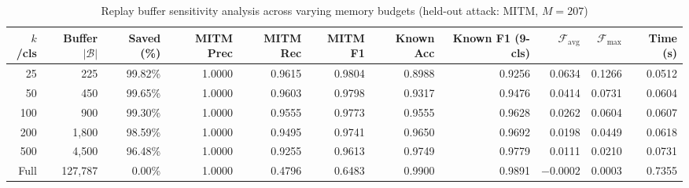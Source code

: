 \begin{table}[htbp]
\centering
\scriptsize
\setlength{\tabcolsep}{3pt}
\renewcommand{\arraystretch}{1.25}
\caption{Replay buffer sensitivity analysis across varying memory budgets (held-out attack: MITM, $M = 207$)}
\label{tab:phase7_1_sensitivity}
\begin{tabular}{|r|r|r|r|r|r|r|r|r|r|r|}
\hline
\textbf{$k$/cls} & \textbf{Buffer $|\mathcal{B}|$} & \textbf{Saved (\%)} & \textbf{MITM Prec} & \textbf{MITM Rec} & \textbf{MITM F1} & \textbf{Known Acc} & \textbf{Known F1 (9-cls)} & $\mathcal{F}_{\text{avg}}$ & $\mathcal{F}_{\max}$ & \textbf{Time (s)} \\ \hline
25   & 225       & 99.82\% & 1.0000 & 0.9615 & 0.9804 & 0.8988 & 0.9256 & 0.0634 & 0.1266 & 0.0512 \\
50   & 450       & 99.65\% & 1.0000 & 0.9603 & 0.9798 & 0.9317 & 0.9476 & 0.0414 & 0.0731 & 0.0604 \\
100  & 900       & 99.30\% & 1.0000 & 0.9555 & 0.9773 & 0.9555 & 0.9628 & 0.0262 & 0.0604 & 0.0607 \\
200  & 1{,}800   & 98.59\% & 1.0000 & 0.9495 & 0.9741 & 0.9650 & 0.9692 & 0.0198 & 0.0449 & 0.0618 \\
500  & 4{,}500   & 96.48\% & 1.0000 & 0.9255 & 0.9613 & 0.9749 & 0.9779 & 0.0111 & 0.0210 & 0.0731 \\ \hline
Full & 127{,}787 & 0.00\%  & 1.0000 & 0.4796 & 0.6483 & 0.9900 & 0.9891 & $-0.0002$ & 0.0003 & 0.7355 \\ \hline
\end{tabular}
\end{table}

